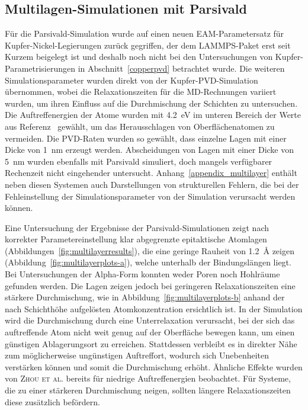 \subsection{Multilagen-Simulationen mit Parsivald}

Für die Parsivald-Simulation wurde auf einen neuen EAM-Parametersatz für Kupfer-Nickel-Legierungen zurück gegriffen\cite{onat_optimized_2014}, der dem LAMMPS-Paket erst seit Kurzem beigelegt ist und deshalb noch nicht bei den Untersuchungen von Kupfer-Parametrisierungen in Abschnitt~\ref{copperpvd} betrachtet wurde.
Die weiteren Simulationsparameter wurden direkt von der Kupfer-PVD-Simu\-la\-tion übernommen, wobei die Relaxationszeiten für die MD-Rechnungen variiert wurden, um ihren Einfluss auf die Durchmischung der Schichten zu untersuchen.
Die Auftreffenergien der Atome wurden mit \SI{4.2}{\electronvolt} im unteren Bereich der Werte aus Referenz~\cite{zhou_atomistic_1998} gewählt, um das Herausschlagen von Oberflächenatomen zu vermeiden.
Die PVD-Raten wurden so gewählt, dass einzelne Lagen mit einer Dicke von \SI{1}{\nano\meter} erzeugt werden.
Abscheidungen von Lagen mit einer Dicke von \SI{5}{\nano\meter} wurden ebenfalls mit Parsivald simuliert, doch mangels verfügbarer Rechenzeit nicht eingehender untersucht.
Anhang~\ref{appendix_multilayer} enthält neben diesen Systemen auch Darstellungen von strukturellen Fehlern, die bei der Fehleinstellung der Simulationsparameter von der Simulation verursacht werden können.

Eine Untersuchung der Ergebnisse der Parsivald-Simulationen zeigt nach korrekter Parametereinstellung klar abgegrenzte epitaktische Atomlagen (Abbildungen~\ref{fig:multilayerresults}), die eine geringe Rauheit von \SI{1.2}{\angstrom} zeigen (Abbildung~\ref{fig:multilayerplots-a}), welche unterhalb der Bindungslängen liegt.
Bei Untersuchungen der Alpha-Form konnten weder Poren noch Hohlräume gefunden werden.
Die Lagen zeigen jedoch bei geringeren Relaxationszeiten eine stärkere Durchmischung, wie in Abbildung~\ref{fig:multilayerplots-b} anhand der nach Schichthöhe aufgelösten Atomkonzentration ersichtlich ist.
In der Simulation wird die Durchmischung durch eine Unterrelaxation verursacht, bei der sich das auftreffende Atom nicht weit genug auf der Oberfläche bewegen kann, um einen günstigen Ablagerungsort zu erreichen.
Stattdessen verbleibt es in direkter Nähe zum möglicherweise ungünstigen Auftreffort, wodurch sich Unebenheiten verstärken können und somit die Durchmischung erhöht.
Ähnliche Effekte wurden von \textsc{Zhou et al.}\cite{zhou_atomistic_1998} bereits für niedrige Auftreffenergien beobachtet.
Für Systeme, die zu einer stärkeren Durchmischung neigen, sollten längere Relaxationszeiten diese zusätzlich befördern.

